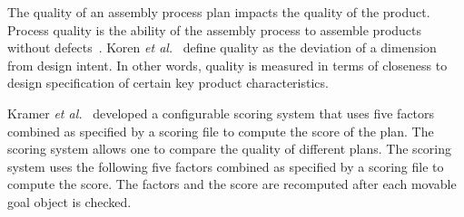 The quality of an assembly process plan impacts the quality of the product. Process quality is the ability of the assembly process to assemble products without defects~\cite{Park.1987}. Koren \textit{et al.}~\cite{Koren.1998} define quality as the deviation of a dimension from design intent. In other words, quality is measured in terms of closeness to design specification of certain key product characteristics.

Kramer \textit{et al.}~\cite{Kramer.2013} developed a configurable scoring system that uses five factors combined as specified by a scoring file
to compute the score of the plan. The scoring system allows one to compare the quality of different plans. The scoring system uses the following five factors combined as specified by a scoring file to compute the score. The factors and the score are recomputed after each movable goal object is checked.

